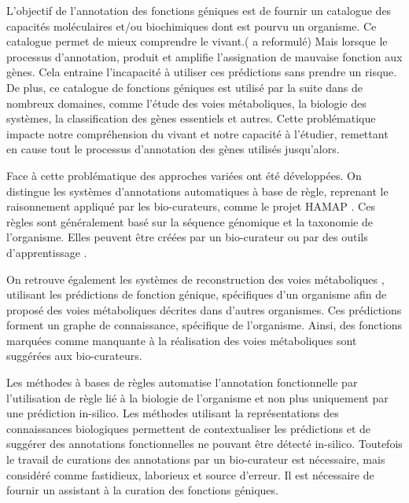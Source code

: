 L'objectif de l'annotation des fonctions géniques est de fournir un catalogue des capacités moléculaires et/ou biochimiques dont est pourvu un organisme. Ce catalogue permet de mieux comprendre le vivant.( a reformulé) Mais lorsque le processus d'annotation, produit et amplifie l'assignation de mauvaise fonction aux gènes. Cela entraine l'incapacité à utiliser ces prédictions sans prendre un risque. De plus, ce catalogue de fonctions géniques est utilisé par la suite dans de nombreux domaines, comme l'étude des voies métaboliques, la biologie des systèmes, la classification des gènes essentiels et autres. Cette problématique impacte notre compréhension du vivant et notre capacité à l'étudier, remettant en cause tout le processus d'annotation des gènes utilisés jusqu'alors.

Face à cette problématique des approches variées ont été développées. On distingue les systèmes d'annotations automatiques à base de règle, reprenant le raisonnement appliqué par les bio-curateurs, comme le projet HAMAP \citep[voir][]{lima2009hamap}. Ces règles sont généralement basé sur la séquence génomique et la taxonomie de l'organisme. Elles peuvent être créées par un bio-curateur ou par des outils d'apprentissage \citep[voir][]{uniprot2011ongoing}.

On retrouve également les systèmes de reconstruction des voies métaboliques \citep[voir][]{karpe2011pathway}, utilisant les prédictions de fonction génique, spécifiques d'un organisme afin de proposé des voies métaboliques décrites dans d'autres organismes. Ces prédictions forment un graphe de connaissance, spécifique de l'organisme. Ainsi, des fonctions marquées comme manquante à la réalisation des voies métaboliques sont suggérées aux bio-curateurs.

Les méthodes à bases de règles automatise l'annotation fonctionnelle par l'utilisation de règle lié à la biologie de l'organisme et non plus uniquement par une prédiction in-silico. Les méthodes utilisant la représentations des connaissances biologiques permettent de contextualiser les prédictions et de suggérer des annotations fonctionnelles ne pouvant être détecté in-silico. Toutefois le travail de curations des annotations par un bio-curateur est nécessaire, mais considéré comme fastidieux, laborieux et source d'erreur. Il est nécessaire de fournir un assistant à la curation des fonctions géniques.


